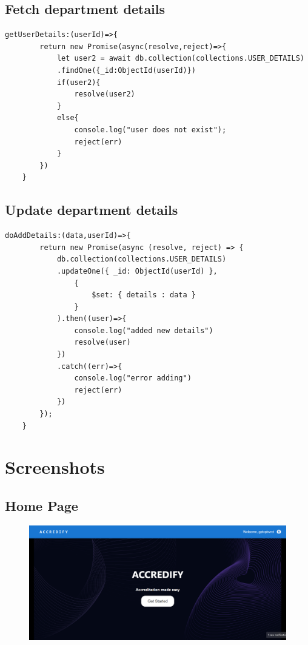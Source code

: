 \documentclass[a4paper,11pt]{report}
\begin{document}
\section{Fetch department details}
\begin{verbatim}
getUserDetails:(userId)=>{
        return new Promise(async(resolve,reject)=>{
            let user2 = await db.collection(collections.USER_DETAILS)
            .findOne({_id:ObjectId(userId)})
            if(user2){
                resolve(user2)
            }
            else{
                console.log("user does not exist");
                reject(err)
            }
        })
    }
\end{verbatim}

\section{Update department details}
\begin{verbatim}
doAddDetails:(data,userId)=>{
        return new Promise(async (resolve, reject) => {
            db.collection(collections.USER_DETAILS)
            .updateOne({ _id: ObjectId(userId) },
                { 
                    $set: { details : data } 
                }
            ).then((user)=>{
                console.log("added new details")
                resolve(user)
            })
            .catch((err)=>{
                console.log("error adding")
                reject(err)
            })
        });
    }
\end{verbatim}

\chapter{Screenshots}

\section{Home Page}
\begin{figure}[h]
	\centering
	\hspace{21pt}
	\includegraphics[width=.70\linewidth]{accredify0.png}
	\label{fig:logo.png}
\end{figure}
\end{document}
